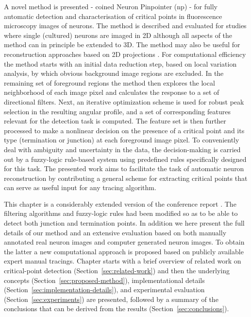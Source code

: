 A novel method is presented - coined Neuron Pinpointer (\gls{np}) - for fully automatic detection and characterisation of critical points in fluorescence microscopy images of neurons. The method is described and evaluated for studies where single (cultured) neurons are imaged in 2D although all aspects of the method can in principle be extended to 3D. The method may also be useful for reconstruction approaches based on 2D projections \cite{zhou2015neuron}. For computational efficiency the method starts with an initial data reduction step, based on local variation analysis, by which obvious background image regions are excluded. In the remaining set of foreground regions the method then explores the local neighborhood of each image pixel and calculates the response to a set of directional filters. Next, an iterative optimization scheme is used for robust peak selection in the resulting angular profile, and a set of corresponding features relevant for the detection task is computed. The feature set is then further processed to make a nonlinear decision on the presence of a critical point and its type (termination or junction) at each foreground image pixel. To conveniently deal with ambiguity and uncertainty in the data, the decision-making is carried out by a fuzzy-logic rule-based system using predefined rules specifically designed for this task. The presented work aims to facilitate the task of automatic neuron reconstruction by contributing a general scheme for extracting critical points that can serve as useful input for any tracing algorithm.

This chapter is a considerably extended version of the conference report \cite{radojevic2014fuzzy}. The filtering algorithms and fuzzy-logic rules had been modified so as to be able to detect both junction and termination points. In addition we here present the full details of our method and an extensive evaluation based on both manually annotated real neuron images and computer generated neuron images. To obtain the latter a new computational approach is proposed based on publicly available expert manual tracings. Chapter starts with a brief overview of related work on critical-point detection (Section~\ref{sec:related-work}) and then the underlying concepts (Section~\ref{sec:proposed-method}), implementational details (Section~\ref{sec:implementation-details}), and experimental evaluation (Section~\ref{sec:experiments}) are presented, followed by a summary of the conclusions that can be derived from the results (Section~\ref{sec:conclusions}).

